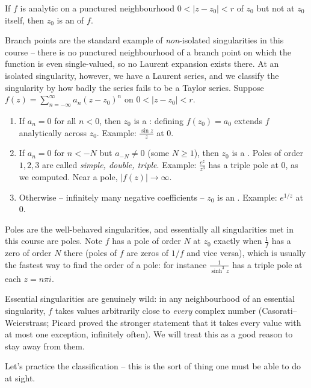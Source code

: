\documentclass[a4paper]{scrartcl}
\begin{document}
\begin{definition}
	If $f$ is analytic on a punctured neighbourhood $0 < |z - z_0| < r$ of $z_0$ but not at $z_0$ itself, then $z_0$ is an  of $f$.
\end{definition}

Branch points are the standard example of \emph{non}-isolated singularities in this course -- there is no punctured neighbourhood of a branch point on which the function is even single-valued, so no Laurent expansion exists there. At an isolated singularity, however, we have a Laurent series, and we classify the singularity by how badly the series fails to be a Taylor series. Suppose $f(z) = \sum_{n=-\infty}^{\infty} a_n (z - z_0)^n$ on $0 < |z - z_0| < r$.

\begin{enumerate}[label=(\roman*)]
	\item If $a_n = 0$ for all $n < 0$, then $z_0$ is a : defining $f(z_0) = a_0$ extends $f$ analytically across $z_0$. Example: $\frac{\sin z}{z}$ at $0$.
	\item If $a_n = 0$ for $n < -N$ but $a_{-N} \neq 0$ (some $N \geq 1$), then $z_0$ is a . Poles of order $1, 2, 3$ are called \emph{simple, double, triple}. Example: $\frac{e^z}{z^3}$ has a triple pole at $0$, as we computed. Near a pole, $|f(z)| \to \infty$.
	\item Otherwise -- infinitely many negative coefficients -- $z_0$ is an . Example: $e^{1/z}$ at $0$.
\end{enumerate}

Poles are the well-behaved singularities, and essentially all singularities met in this course are poles. Note $f$ has a pole of order $N$ at $z_0$ exactly when $\frac{1}{f}$ has a zero of order $N$ there (poles of $f$ are zeros of $1/f$ and vice versa), which is usually the fastest way to find the order of a pole: for instance $\frac{1}{\sinh^3 z}$ has a triple pole at each $z = n\pi i$.

Essential singularities are genuinely wild: in any neighbourhood of an essential singularity, $f$ takes values arbitrarily close to \emph{every} complex number (Casorati--Weierstrass; Picard proved the stronger statement that it takes every value with at most one exception, infinitely often). We will treat this as a good reason to stay away from them.

Let's practice the classification -- this is the sort of thing one must be able to do at sight.
\end{document}
